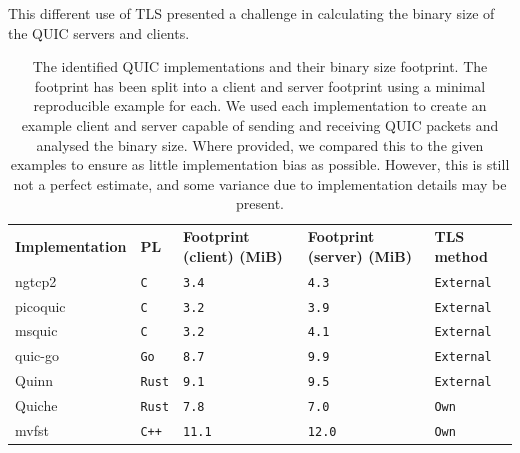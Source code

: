 This different use of TLS presented a challenge in calculating the binary size of the QUIC servers and clients.

\begin{table}[ht]
    \caption{The identified QUIC implementations and their binary size footprint. The footprint has been split into a client and server footprint using a minimal reproducible example for each. We used each implementation to create an example client and server capable of sending and receiving QUIC packets and analysed the binary size. Where provided, we compared this to the given examples to ensure as little implementation bias as possible. However, this is still not a perfect estimate, and some variance due to implementation details may be present.}\label{tab:quics}
    \begin{tabular}{@{}lp{18mm}p{29mm}p{29mm}l@{}}
        \toprule
        \textbf{Implementation} & \textbf{PL}   & \textbf{Footprint \newline (client) (MiB)} & \textbf{Footprint 
    \newline(server) (MiB)} & \textbf{TLS method} \\
        ngtcp2                  & \texttt{C}    & \texttt{3.4}                      & \texttt{4.3}                      & \texttt{External}   \\
        picoquic                & \texttt{C}    & \texttt{3.2}                      & \texttt{3.9}                      & \texttt{External}   \\
        msquic                  & \texttt{C}    & \texttt{3.2}                      & \texttt{4.1}                      & \texttt{External}   \\
        quic-go                 & \texttt{Go}   & \texttt{8.7}                      & \texttt{9.9}                      & \texttt{External}   \\
        Quinn                   & \texttt{Rust} & \texttt{9.1}                      & \texttt{9.5}                      & \texttt{External}   \\
        Quiche                  & \texttt{Rust} & \texttt{7.8}                      & \texttt{7.0}                      & \texttt{Own}        \\
        mvfst                   & \texttt{C++}  & \texttt{11.1}                     & \texttt{12.0}                     & \texttt{Own}        \\
        \bottomrule
    \end{tabular}
\end{table}


